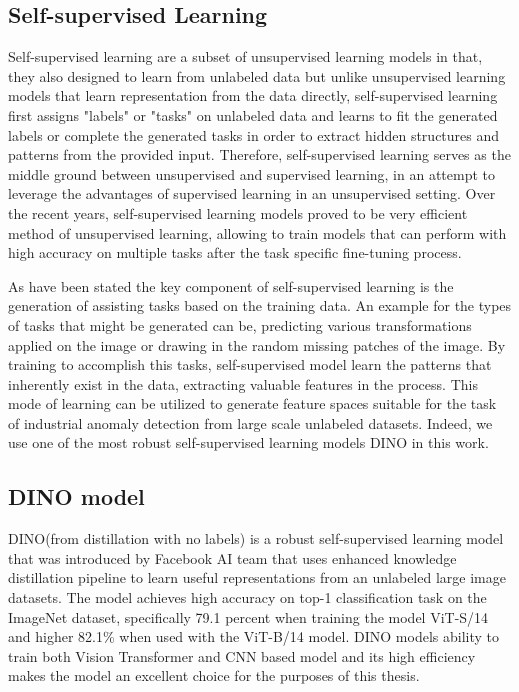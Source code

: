 \subsection{Self-supervised Learning}
\label{self-supervised learning}
Self-supervised learning are a subset of unsupervised learning models in that, they also designed to learn from unlabeled data but unlike unsupervised learning models that learn representation from the data directly, self-supervised learning first assigns "labels" or "tasks" on unlabeled data and learns to fit the generated labels or complete the generated tasks in order to extract hidden structures and patterns from the provided input. Therefore, self-supervised learning serves as the middle ground between unsupervised and supervised learning, in an attempt to leverage the advantages of supervised learning in an unsupervised setting. Over the recent years, self-supervised learning models proved to be very efficient method of unsupervised learning, allowing to train models that can perform with high accuracy on multiple tasks after the task specific fine-tuning process.

As have been stated the key component of self-supervised learning is the generation of assisting tasks based on the training data. An example for the types of tasks that might be generated can be, predicting various transformations applied on the image or drawing in the random missing patches of the image. By training to accomplish this tasks, self-supervised model learn the patterns that inherently exist in the data, extracting valuable features in the process. This mode of learning can be utilized to generate feature spaces suitable for the task of industrial anomaly detection from large scale unlabeled datasets. Indeed, we use one of the most robust self-supervised learning models DINO in this work.

\subsection{DINO model}
\label{dino}
DINO(from distillation with no labels) is a robust self-supervised learning model that was introduced by Facebook AI team that uses enhanced knowledge distillation pipeline to learn useful representations from an unlabeled large image datasets. The model achieves high accuracy on top-1 classification task on the ImageNet dataset, specifically 79.1 percent when training the model ViT-S/14 and higher 82.1\% when used with the ViT-B/14 model. DINO models ability to train both Vision Transformer and CNN based model and its high efficiency makes the model an excellent choice for the purposes of this thesis.

